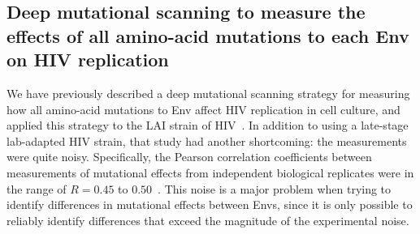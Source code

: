 \documentclass[9pt]{elife}
\begin{document}
\subsection*{Deep mutational scanning to measure the effects of all amino-acid mutations to each Env on HIV replication}
We have previously described a deep mutational scanning strategy for measuring how all amino-acid mutations to Env affect HIV replication in cell culture, and applied this strategy to the LAI strain of HIV~\citep{haddox2016experimental}.
In addition to using a late-stage lab-adapted HIV strain, that study had another shortcoming: the measurements were quite noisy.
Specifically, the Pearson correlation coefficients between measurements of mutational effects from independent biological replicates were in the range of $R = 0.45$ to $0.50$~\citep{haddox2016experimental}.
This noise is a major problem when trying to identify differences in mutational effects between Envs, since it is only possible to reliably identify differences that exceed the magnitude of the experimental noise. 
\end{document}

